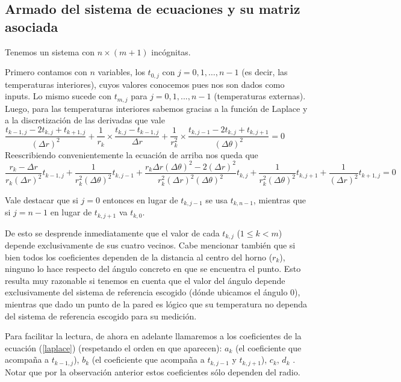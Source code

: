   
\subsection{Armado del sistema de ecuaciones y su matriz asociada}
Tenemos un sistema con $n\times(m+1)$ incógnitas.

Primero contamos con $n$ variables, los $t_{0,j}$ con $j = 0,1,\hdots, n-1$ (es decir, las temperaturas interiores), cuyos valores conocemos pues nos son dados como inputs. Lo mismo sucede con $t_{m, j}$ para $j = 0,1,..., n-1$ (temperaturas externas).
Luego, para las temperaturas interiores sabemos gracias a la función de Laplace y a la discretización de las derivadas que vale \\

$\dfrac{t_{k-1,j} - 2t_{k,j} + t_{k+1,j}}{(\Delta r)^2} 
+ \dfrac{1}{r_k} \times \dfrac{t_{k,j} - t_{k-1,j}}{\Delta r}
+ \dfrac{1}{r_{k}^2} \times \dfrac{t_{k,j-1} -2t_{k,j} + t_{k,j+1}}{(\Delta \theta)^2} = 0$\\

Reescribiendo convenientemente la ecuación de arriba nos queda que \\

\begin{equation}
\label{laplace}
\dfrac{r_k - \Delta r}{r_k (\Delta r)^2} t_{k-1, j} +
\dfrac{1}{r_k^2(\Delta \theta)^2} t_{k, j-1} +
\dfrac{r_k \Delta r (\Delta \theta)^2 - 2(\Delta r)^2}{r_k^2 (\Delta r)^2 (\Delta \theta)^2} t_{k,j} +
\dfrac{1}{r_k^2(\Delta \theta)^2} t_{k, j+1} +
\dfrac{1}{(\Delta r)^2} t_{k+1,j}  = 0
\end{equation}

Vale destacar que si $j = 0$ entonces en lugar de $t_{k, j-1}$ se usa $t_{k, n-1}$, mientras que si $j = n-1$ en lugar de $t_{k, j+1}$ va $t_{k, 0}$.

De esto se desprende inmediatamente que el valor de cada $t_{k,j}$ ($1\leq k < m$) depende exclusivamente de sus cuatro vecinos. Cabe mencionar también que si bien todos los coeficientes dependen de la distancia al centro del horno ($r_k$), ninguno lo hace respecto del ángulo concreto en que se encuentra el punto. Esto resulta muy razonable si tenemos en cuenta que el valor del ángulo depende exclusivamente del sistema de referencia escogido (dónde ubicamos el ángulo 0), mientras que dado un punto de la pared es lógico que su temperatura no dependa del sistema de referencia escogido para su medición.

Para facilitar la lectura, de ahora en adelante llamaremos a los coeficientes de la ecuación (\ref{laplace}) (respetando el orden en que aparecen): $a_k$ (el coeficiente que acompaña a $t_{k-1, j}$), $b_k$ (el coeficiente que acompaña a $t_{k, j-1}$ y $t_{k, j+1}$), $c_k$, $d_k$ . Notar que por la observación anterior estos coeficientes sólo dependen del radio.

